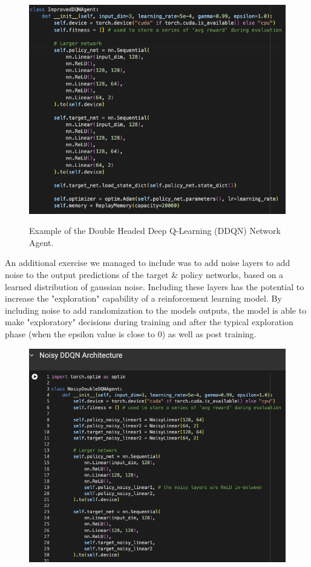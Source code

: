 \documentclass[compsoc]{IEEEtran}
\begin{document}
{\begin{figure}[h]
\centering
{\includegraphics[scale=0.3]{./fig/DQN.png}}
\caption{Example of the Double Headed Deep Q-Learning (DDQN) Network Agent.}
\end{figure}
\vfill
An additional exercise we managed to include was to add noise layers to add noise to the output predictions of the target & policy networks, based on a learned distribution of gaussian noise. Including these layers has the potential to increase the "exploration" capability of a reinforcement learning model. By including noise to add randomization to the models outputs, the model is able to make "exploratory" decisions during training and after the typical exploration phase (when the epsilon value is close to 0) as well as post training.
\begin{figure}[h]
\centering
{\includegraphics[scale=0.3]{./fig/NoisyDDQN.png}}

\end{figure}}
\end{document}
